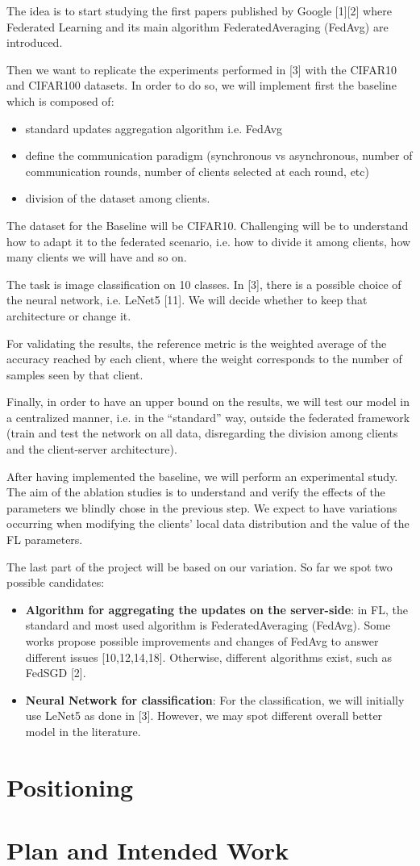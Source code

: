 \documentclass{article}
\begin{document}
The idea is to start studying the first papers published by Google [1][2] 
where Federated Learning and its main algorithm FederatedAveraging (FedAvg) are introduced.

Then we want to replicate the experiments performed in [3] with the CIFAR10 and CIFAR100 datasets.
In order to do so, we will implement first the baseline which is composed of:
\begin{itemize}
    \item standard updates aggregation algorithm i.e. FedAvg
    \item define the communication paradigm (synchronous vs asynchronous, number of communication
		rounds, number of clients selected at each round, etc)
	\item division of the dataset among clients.
\end{itemize}
The dataset for the Baseline will be CIFAR10. Challenging will be to understand how to adapt it to
the federated scenario, i.e. how to divide it among clients, how many clients we will have and so on.

The task is image classification on 10 classes. In [3], there is a possible choice of the neural
network, i.e. LeNet5 [11]. We will decide whether to keep that architecture or change it.

For validating the results, the reference metric is the weighted average of the accuracy reached
by each client, where the weight corresponds to the number of samples seen by that client. 

Finally, in order to have an upper bound on the results, we will test our model in a
centralized manner, i.e. in the “standard” way, outside the federated framework (train and test the network on all data, disregarding the division among clients and the client-server architecture).

After having implemented the baseline, we will perform an experimental study. The aim of the ablation studies is to understand and verify the effects of the parameters we
blindly chose in the previous step. We expect to have variations occurring when modifying the clients’ local data distribution and the value of the FL parameters.

The last part of the project will be based on our variation. So far we spot two possible candidates:

\begin{itemize}
    \item \textbf{Algorithm for aggregating the updates on the server-side}: in FL, the standard and most
used algorithm is FederatedAveraging (FedAvg). Some works propose possible improvements and changes of FedAvg to answer different issues [10,12,14,18]. Otherwise, different algorithms exist, such as FedSGD [2].
\item \textbf{Neural Network for classification}: For the classification, we will initially use LeNet5 as done in [3]. However, we may spot different overall better model in the literature.
\end{itemize}





\section{Positioning}

\section{Plan and Intended Work}
	
\end{document}
